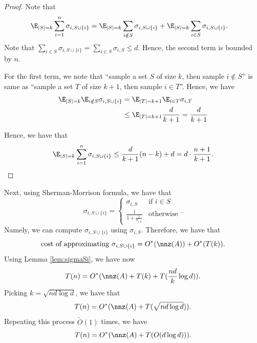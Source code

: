 \begin{proof}
Note that
\begin{align*}
\E_{|S|=k}\sum_{i=1}^{n}\sigma_{i,S\cup\{i\}} & =\E_{|S|=k}\sum_{i\notin S}\sigma_{i,S\cup\{i\}}+\E_{|S|=k}\sum_{i\in S}\sigma_{i,S\cup\{i\}}.
\end{align*}
Note that $\sum_{i\in S}\sigma_{i,S\cup\{i\}}=\sum_{i\in S}\sigma_{i,S}\leq d$.
Hence, the second term is bounded by $n$. 

For the first term, we note that ``sample a set $S$ of size $k$,
then sample $i\notin S$'' is same as ``sample a set $T$ of size
$k+1$, then sample $i\in T$''. Hence, we have
\begin{align*}
\E_{|S|=k}\E_{i\notin S}\sigma_{i,S\cup\{i\}} & =\E_{|T|=k+1}\E_{i\in T}\sigma_{i,T}\\
 & \leq\E_{|T|=k+1}\frac{d}{k+1}=\frac{d}{k+1}
\end{align*}

Hence, we have that
\[
\E_{|S|=k}\sum_{i=1}^{n}\sigma_{i,S\cup\{i\}}\leq\frac{d}{k+1}(n-k)+d=d\cdot\frac{n+1}{k+1}.
\]
\end{proof}
Next, using Sherman-Morrison formula, we have that
\[
\sigma_{i,S\cup\{i\}}=\begin{cases}
\sigma_{i,S} & \text{if }i\in S\\
\frac{1}{1+\frac{1}{\sigma_{i,S}}} & \mbox{otherwise}
\end{cases}.
\]
Namely, we can compute $\sigma_{i,S\cup\{i\}}$ using $\sigma_{i,S}$.
Therefore, we have that
\[
\text{cost of approximating }\sigma_{i,S\cup\{i\}}=O^{*}(\nnz(A))+O^{*}(T(k)).
\]
Using Lemma \ref{lem:sigmaSi}, we have now
\[
T(n)=O^{*}(\nnz(A)+T(k)+T(\frac{nd}{k}\log d)).
\]
Picking $k=\sqrt{nd\log d}$, we have that
\[
T(n)=O^{*}(\nnz(A)+T(\sqrt{nd\log d})).
\]
Repeating this process $\tilde{O}(1)$ times, we have
\[
T(n)=O^{*}(\nnz(A)+T(O(d\log d))).
\]


